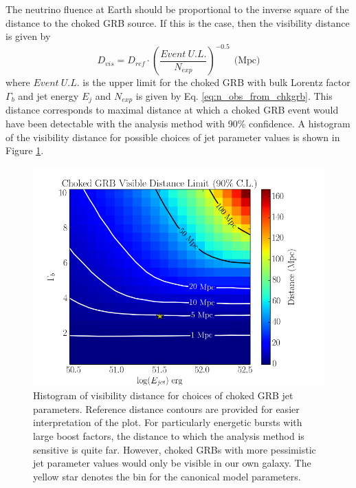 \documentclass{gatech-thesis}
\begin{document}
The neutrino fluence at Earth should be proportional to the inverse square of the distance to the choked GRB source. If this is the case, then the visibility distance is given by
\begin{equation}\label{eq:vis_dist}
D_{vis} = D_{ref} \cdot \left(\frac{Event\: U.L.}{N_{exp}}  \right)^{-0.5} \: \: \text{(Mpc)}
\end{equation}
where $Event \: U.L.$ is the upper limit for the choked GRB with bulk Lorentz factor $\Gamma_b$ and jet energy $E_j$ and $N_{exp}$ is given by Eq. \ref{eq:n_obs_from_chkgrb}. This distance corresponds to maximal distance at which a choked GRB event would have been detectable with the analysis method with 90$\%$ confidence. A histogram of the visibility distance for possible choices of jet parameter values is shown in Figure \ref{fig:ParameterDepVisDist}.
\begin{figure}[ht]
  \begin{center}
    \includegraphics[width=1.0\textwidth,keepaspectratio]{DistanceLimit_2DHisto_WithContours_SysAdj.png}
  \end{center}
  \caption[Choked GRB Visibility Distance]{Histogram of visibility distance for choices of choked GRB jet parameters. Reference distance contours are provided for easier interpretation of the plot. For particularly energetic bursts with large boost factors, the distance to which the analysis method is sensitive is quite far. However, choked GRBs with more pessimistic jet parameter values would only be visible in our own galaxy. The yellow star denotes the bin for the canonical model parameters.}
  \label{fig:ParameterDepVisDist}
\end{figure}
\end{document}
